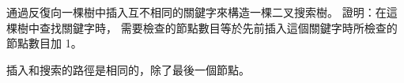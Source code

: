 \startEXERCISE
通過反復向一棵樹中插入互不相同的關鍵字來構造一棵二叉搜索樹。
證明：在這棵樹中查找關鍵字時，
需要檢查的節點數目等於先前插入這個關鍵字時所檢查的節點數目加 1。
\stopEXERCISE

\startANSWER
插入和搜索的路徑是相同的，除了最後一個節點。
\stopANSWER
